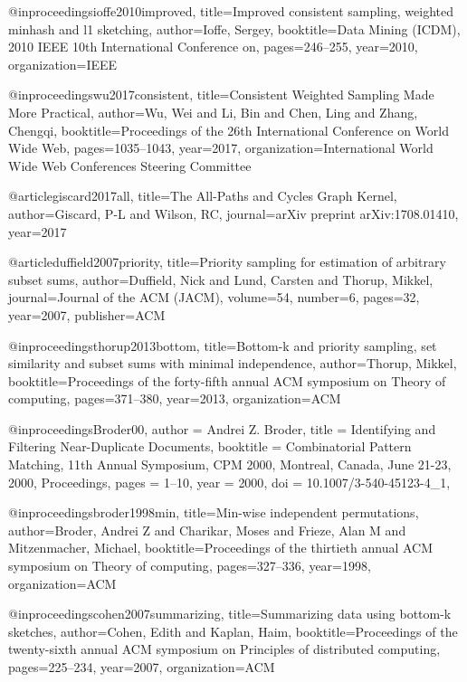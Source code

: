 @inproceedings{ioffe2010improved,
  title={Improved consistent sampling, weighted minhash and l1 sketching},
  author={Ioffe, Sergey},
  booktitle={Data Mining (ICDM), 2010 IEEE 10th International Conference on},
  pages={246--255},
  year={2010},
  organization={IEEE}
}

@inproceedings{wu2017consistent,
  title={Consistent Weighted Sampling Made More Practical},
  author={Wu, Wei and Li, Bin and Chen, Ling and Zhang, Chengqi},
  booktitle={Proceedings of the 26th International Conference on World Wide Web},
  pages={1035--1043},
  year={2017},
  organization={International World Wide Web Conferences Steering Committee}
}

@article{giscard2017all,
  title={The All-Paths and Cycles Graph Kernel},
  author={Giscard, P-L and Wilson, RC},
  journal={arXiv preprint arXiv:1708.01410},
  year={2017}
}

@article{duffield2007priority,
  title={Priority sampling for estimation of arbitrary subset sums},
  author={Duffield, Nick and Lund, Carsten and Thorup, Mikkel},
  journal={Journal of the ACM (JACM)},
  volume={54},
  number={6},
  pages={32},
  year={2007},
  publisher={ACM}
}

@inproceedings{thorup2013bottom,
  title={Bottom-k and priority sampling, set similarity and subset sums with minimal independence},
  author={Thorup, Mikkel},
  booktitle={Proceedings of the forty-fifth annual ACM symposium on Theory of computing},
  pages={371--380},
  year={2013},
  organization={ACM}
}

@inproceedings{Broder00,
  author    = {Andrei Z. Broder},
  title     = {Identifying and Filtering Near-Duplicate Documents},
  booktitle = {Combinatorial Pattern Matching, 11th Annual Symposium, {CPM} 2000,
               Montreal, Canada, June 21-23, 2000, Proceedings},
  pages     = {1--10},
  year      = {2000},
  doi       = {10.1007/3-540-45123-4_1},
}

@inproceedings{broder1998min,
  title={Min-wise independent permutations},
  author={Broder, Andrei Z and Charikar, Moses and Frieze, Alan M and Mitzenmacher, Michael},
  booktitle={Proceedings of the thirtieth annual ACM symposium on Theory of computing},
  pages={327--336},
  year={1998},
  organization={ACM}
}

@inproceedings{cohen2007summarizing,
  title={Summarizing data using bottom-k sketches},
  author={Cohen, Edith and Kaplan, Haim},
  booktitle={Proceedings of the twenty-sixth annual ACM symposium on Principles of distributed computing},
  pages={225--234},
  year={2007},
  organization={ACM}
}

